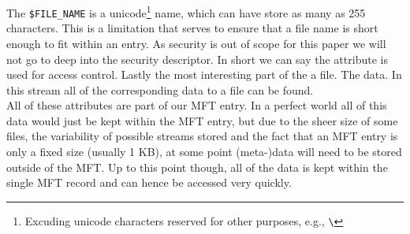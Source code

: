 The \texttt{\$FILE\_NAME} is a unicode\footnote{Excuding unicode characters reserved for other purposes, e.g., \texttt{\textbackslash}} name, which can have store as many as 255 characters.\cite{microsoftinc:2018:MFP} This is a limitation that serves to ensure that a  file name is  short enough to fit within an entry.
As security is out of scope for this paper we will not go to deep into the security descriptor. In short we can say  the attribute is used for access control.
Lastly the most interesting part of the a file. The data. In this stream all of the corresponding data to a file can be found.\\
All of these attributes are part of our MFT entry. In a perfect world all of this data would just be kept within the MFT entry, but due to the sheer size of some files, the variability of possible streams stored and the fact that an MFT entry is only a fixed size (usually 1 KB\cite{B:2017:AJI}), at some point (meta-)data will need to be stored outside of the MFT. Up to this point though, all of the data is kept within the single MFT record and can hence be accessed very quickly.
